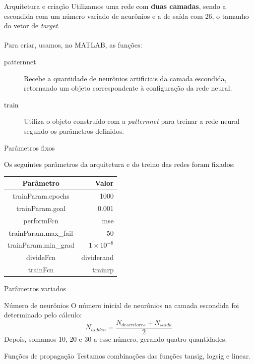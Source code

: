 \begin{frame}{Arquitetura e criação}
	Utilizamos uma rede com \textbf{duas camadas}, sendo a escondida
	com um número variado de neurônios e a de saída com 26, o tamanho
	do vetor de \emph{target}.\\~\\

	Para criar, usamos, no MATLAB, as funções:

\begin{description}
        \item [patternnet] Recebe a quantidade de neurônios artificiais
                da camada escondida, retornando um objeto correspondente
                à configuração da rede neural. 
        \item [train] Utiliza o objeto construído com a \emph{patternnet} para
                treinar a rede neural segundo os parâmetros definidos. 
\end{description}
\end{frame}

\begin{frame}{Parâmetros fixos}

Os seguintes parâmetros da arquitetura e do treino
 das redes foram fixados:

\begin{table}[H] 
\centering 
\begin{tabular}{c|r} 
        Parâmetro & Valor \\ 
        \hline 
        trainParam.epochs & 1000\\ 
        trainParam.goal & 0.001\\ 
        performFcn & mse\\ 
        trainParam.max\_fail & 50\\ 
        trainParam.min\_grad & $1 \times 10^{-8}$\\ 
        divideFcn & dividerand\\ 
        trainFcn & trainrp\\ 
\end{tabular} 
\end{table}


\end{frame}

\begin{frame}{Parâmetros variados}

	\begin{block}{Número de neurônios}
		O número inicial de neurônios na camada escondida 
			foi determinado pelo cálculo:
			$$N_{hidden} = \frac{N_{descritores} + N_{saida}}{2}$$			
		Depois, somamos 10, 20 e 30 a esse número, gerando quatro quantidades.
	\end{block}

	\begin{block}{Funções de propagação}
		Testamos combinações das funções tansig, logsig e linear.
	\end{block}

\end{frame}

